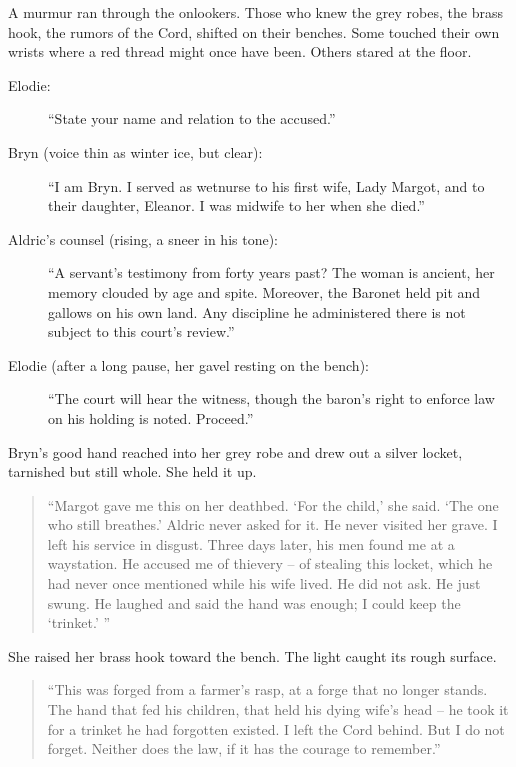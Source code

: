 \documentclass[11pt]{book}
\begin{document}
A murmur ran through the onlookers. Those who knew the grey robes, the brass hook, the rumors of the Cord, shifted on their benches. Some touched their own wrists where a red thread might once have been. Others stared at the floor.

\begin{description}
\item[Elodie:] ``State your name and relation to the accused.''
\item[Bryn (voice thin as winter ice, but clear):] ``I am Bryn. I served as wetnurse to his first wife, Lady Margot, and to their daughter, Eleanor. I was midwife to her when she died.''
\item[Aldric’s counsel (rising, a sneer in his tone):] ``A servant’s testimony from forty years past? The woman is ancient, her memory clouded by age and spite. Moreover, the Baronet held pit and gallows on his own land. Any discipline he administered there is not subject to this court’s review.''
\item[Elodie (after a long pause, her gavel resting on the bench):] ``The court will hear the witness, though the baron’s right to enforce law on his holding is noted. Proceed.''
\end{description}

Bryn’s good hand reached into her grey robe and drew out a silver locket, tarnished but still whole. She held it up.

\begin{quote}
``Margot gave me this on her deathbed. ‘For the child,’ she said. ‘The one who still breathes.’ Aldric never asked for it. He never visited her grave. I left his service in disgust. Three days later, his men found me at a waystation. He accused me of thievery – of stealing this locket, which he had never once mentioned while his wife lived. He did not ask. He just swung. He laughed and said the hand was enough; I could keep the ‘trinket.’ ''
\end{quote}

She raised her brass hook toward the bench. The light caught its rough surface.

\begin{quote}
``This was forged from a farmer’s rasp, at a forge that no longer stands. The hand that fed his children, that held his dying wife’s head – he took it for a trinket he had forgotten existed. I left the Cord behind. But I do not forget. Neither does the law, if it has the courage to remember.''
\end{quote}
\end{document}

